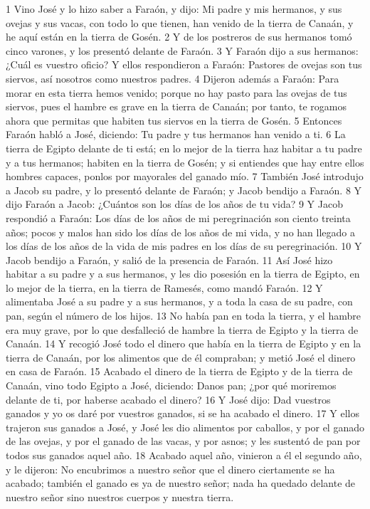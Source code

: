 1 Vino José y lo hizo saber a Faraón, y dijo: Mi padre y mis hermanos, y sus ovejas y sus vacas, con todo lo que tienen, han venido de la tierra de Canaán, y he aquí están en la tierra de Gosén.
2 Y de los postreros de sus hermanos tomó cinco varones, y los presentó delante de Faraón.
3 Y Faraón dijo a sus hermanos: ¿Cuál es vuestro oficio? Y ellos respondieron a Faraón: Pastores de ovejas son tus siervos, así nosotros como nuestros padres.
4 Dijeron además a Faraón: Para morar en esta tierra hemos venido; porque no hay pasto para las ovejas de tus siervos, pues el hambre es grave en la tierra de Canaán; por tanto, te rogamos ahora que permitas que habiten tus siervos en la tierra de Gosén.
5 Entonces Faraón habló a José, diciendo: Tu padre y tus hermanos han venido a ti.
6 La tierra de Egipto delante de ti está; en lo mejor de la tierra haz habitar a tu padre y a tus hermanos; habiten en la tierra de Gosén; y si entiendes que hay entre ellos hombres capaces, ponlos por mayorales del ganado mío.
7 También José introdujo a Jacob su padre, y lo presentó delante de Faraón; y Jacob bendijo a Faraón.
8 Y dijo Faraón a Jacob: ¿Cuántos son los días de los años de tu vida?
9 Y Jacob respondió a Faraón: Los días de los años de mi peregrinación son ciento treinta años; pocos y malos han sido los días de los años de mi vida, y no han llegado a los días de los años de la vida de mis padres en los días de su peregrinación.
10 Y Jacob bendijo a Faraón, y salió de la presencia de Faraón.
11 Así José hizo habitar a su padre y a sus hermanos, y les dio posesión en la tierra de Egipto, en lo mejor de la tierra, en la tierra de Ramesés, como mandó Faraón.
12 Y alimentaba José a su padre y a sus hermanos, y a toda la casa de su padre, con pan, según el número de los hijos.
13 No había pan en toda la tierra, y el hambre era muy grave, por lo que desfalleció de hambre la tierra de Egipto y la tierra de Canaán.
14 Y recogió José todo el dinero que había en la tierra de Egipto y en la tierra de Canaán, por los alimentos que de él compraban; y metió José el dinero en casa de Faraón.
15 Acabado el dinero de la tierra de Egipto y de la tierra de Canaán, vino todo Egipto a José, diciendo: Danos pan; ¿por qué moriremos delante de ti, por haberse acabado el dinero?
16 Y José dijo: Dad vuestros ganados y yo os daré por vuestros ganados, si se ha acabado el dinero.
17 Y ellos trajeron sus ganados a José, y José les dio alimentos por caballos, y por el ganado de las ovejas, y por el ganado de las vacas, y por asnos; y les sustentó de pan por todos sus ganados aquel año.
18 Acabado aquel año, vinieron a él el segundo año, y le dijeron: No encubrimos a nuestro señor que el dinero ciertamente se ha acabado; también el ganado es ya de nuestro señor; nada ha quedado delante de nuestro señor sino nuestros cuerpos y nuestra tierra.
